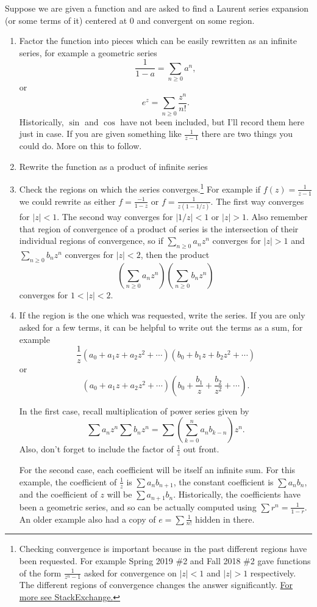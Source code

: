 \documentclass[10pt]{article}
\begin{document}
Suppose we are given a function and are asked to find a Laurent series expansion (or some terms of it) centered at $0$ and convergent on some region. 
\begin{enumerate}
	\item Factor the function into pieces which can be easily rewritten as an infinite series, for example a geometric series \[\frac{1}{1- a} = \sum_{n \geq 0} a^n,\] or \[e^z = \sum_{n\geq 0} \frac{z^n}{n!}.\] 
	Historically, $\sin$ and $\cos$ have not been included, but I'll record them here just in case.
	If you are given something like $\frac{1}{z-1}$ there are two things you could do. More on this to follow.
	\item Rewrite the function as a product of infinite series
	\item Check the regions on which the series converges.\footnote{Checking convergence is important because in the past different regions have been requested. For example Spring 2019 \#2 and Fall 2018 \#2 gave functions of the form $\frac{1}{z^n-1}$ asked for convergence on $|z|<1$ and $|z|>1$ respectively. The different regions of convergence changes the answer significantly. \href{https://math.stackexchange.com/questions/2553132/laurent-series-for-different-domains}{For more see StackExchange.}} For example if $f(z) = \frac{1}{z-1}$ we could rewrite as either $f = \frac{-1}{1-z}$ or $f = \frac{1}{z(1-1/z)}$. 
	The first way converges for $|z|<1$. The second way converges for $|1/z|<1$ or $|z|>1$. Also remember that region of convergence of a product of series is the intersection of their individual regions of convergence, so if $\sum_{n\geq 0} a_n z^n$ converges for $|z|>1$ and $\sum_{n \geq 0} b_n z^n$ converges for $|z|<2$, then the product
	\[ \left ( \sum_{n\geq 0} a_n z^n\right) \left ( \sum_{n \geq 0} b_n z^n\right)\]
	converges for $1 < |z| < 2$.
	
	
	
	\item If the region is the one which was requested, write the series. 
	If you are only asked for a few terms, it can be helpful to write out the terms as a sum, for example
	\[\frac{1}{z} (a_0 + a_1 z + a_2 z^2 + \cdots ) (b_0 + b_1 z + b_2 z^2 + \cdots)\]
	or 
	\[(a_0 + a_1 z + a_2 z^2 + \cdots ) (b_0 + \frac{b_1 }{z} + \frac{b_2}{z^2} + \cdots).\]
	
	In the first case, recall multiplication of power series given by \[\sum a_n z^n \sum b_n z^n = \sum (\sum_{k=0}^n a_n b_{k-n}) z^n.\] Also, don't forget to include the factor of $\frac{1}{z}$ out front. 
	
	For the second case, each coefficient will be itself an infinite sum. For this example, the coefficient of $\frac{1}{z}$ is $\sum a_n b_{n+1}$, the constant coefficient is $\sum a_n b_n$, and the coefficient of $z$ will be $\sum a_{n+1}b_n$. Historically, the coefficients have been a geometric series, and so can be actually computed using $\sum r^n = \frac{1}{1-r}$. An older example also had a copy of $e =  \sum \frac{1}{n!}$ hidden in there.
\end{enumerate}
\end{document}
